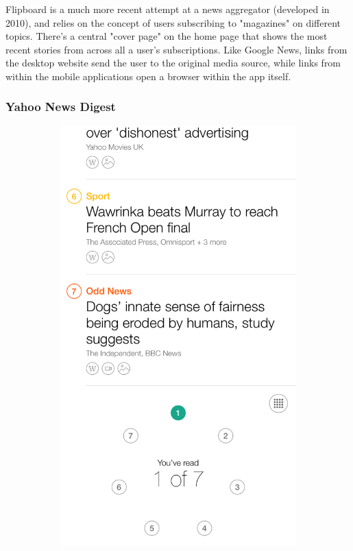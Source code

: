 \documentclass[12pt]{article}
\begin{document}
Flipboard \cite{flipboard} is a much more recent attempt at a news aggregator (developed in 2010), and relies on the concept of users subscribing to "magazines" on different topics. There's a central "cover page" on the home page that shows the most recent stories from across all a user's subscriptions. Like Google News, links from the desktop website send the user to the original media source, while links from within the mobile applications open a browser within the app itself.

\subsubsection{Yahoo News Digest}

\begin{figure}[ht!]
  \centering
  \begin{subfigure}[t]{0.3\textwidth}
        \includegraphics[width=\textwidth]{YNDHome.PNG}

\end{subfigure}
\end{figure}
\end{document}

